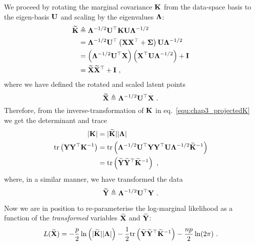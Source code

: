       We proceed by rotating the marginal covariance $\mathbf{K}$ from the data-space basis to the eigen-basis $\mathbf{U}$ and scaling by the eigenvalues $\mathbf{\Lambda}$:
      \begin{equation} \label{equ:chap3_projectedK}
        \begin{split}
	  \widetilde{\mathbf{K}} &\triangleq \mathbf{\Lambda}^{-1/2} \mathbf{U}^\top \mathbf{K} \mathbf{U} \mathbf{\Lambda}^{-1/2} \\
	  &= \mathbf{\Lambda}^{-1/2} \mathbf{U}^\top \left(\mathbf{X}\mathbf{X}^\top + \mathbf{\Sigma} \right) \mathbf{U} \mathbf{\Lambda}^{-1/2} \\
	  &= \left(\mathbf{\Lambda}^{-1/2} \mathbf{U}^\top \mathbf{X}\right) \left(\mathbf{X}^\top \mathbf{U} \mathbf{\Lambda}^{-1/2}\right) + \mathbf{I} \\
	  &= \widetilde{\mathbf{X}} \widetilde{\mathbf{X}}^\top + \mathbf{I} ~,
        \end{split}
      \end{equation}
      where we have defined the rotated and scaled latent points
      \begin{equation} \label{equ:chap3_tranformed_X}
	\widetilde{\mathbf{X}} \triangleq \mathbf{\Lambda}^{-1/2} \mathbf{U}^\top \mathbf{X} ~.
      \end{equation}
      Therefore, from the inverse-transformation of $\mathbf{K}$ in eq.~\eqref{equ:chap3_projectedK} we get the determinant and trace
      \begin{align*} \label{equ:chap3_det}
	\lvert \mathbf{K} \rvert &= \lvert \widetilde{\mathbf{K}} \rvert \lvert \mathbf{\Lambda} \rvert \\
	\mathrm{tr} \left( \mathbf{Y} \mathbf{Y}^\top \mathbf{K}^{-1} \right)
	&= \mathrm{tr} \left( \mathbf{\Lambda}^{-1/2} \mathbf{U}^\top \mathbf{Y}\mathbf{Y}^\top \mathbf{U} \mathbf{\Lambda}^{-1/2} \widetilde{\mathbf{K}}^{-1} \right) \\
	&= \mathrm{tr} \left( \widetilde{\mathbf{Y}} \widetilde{\mathbf{Y}}^\top \widetilde{\mathbf{K}}^{-1} \right) ~,
      \end{align*}
      where, in a similar manner, we have transformed the data
      \begin{equation} \label{equ:chap3_tranformed_Y}
	\widetilde{\mathbf{Y}} \triangleq \mathbf{\Lambda}^{-1/2} \mathbf{U}^\top \mathbf{Y} ~.
      \end{equation}

      Now we are in position to re-parameterise the log-marginal likelihood as a function of the \emph{transformed} variables $\widetilde{\mathbf{X}}$ and $\widetilde{\mathbf{Y}}$:
      \begin{equation*} \label{equ:chap3_translmlY}
	L(\widetilde{\mathbf{X}}) =
        -\frac{p}{2} \ln \left( \lvert \widetilde{\mathbf{K}} \rvert \lvert \mathbf{\Lambda} \rvert \right)
	- \frac{1}{2} \mathrm{tr} \left( \widetilde{\mathbf{Y}} \widetilde{\mathbf{Y}}^\top \widetilde{\mathbf{K}}^{-1} \right)
	- \frac{np}{2} \ln(2\pi) ~.
      \end{equation*}

